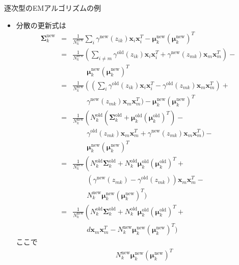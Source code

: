 \documentclass[dvipdfmx,notheorems,t]{beamer}
\begin{document}
\begin{frame}{逐次型のEMアルゴリズムの例}
\begin{itemize}
\begin{itemize}
		\item 分散の更新式は
		\begin{eqnarray}
			\bm{\Sigma}_k^\mathrm{new} &=& \frac{1}{N_k^\mathrm{new}} \sum_i \gamma^\mathrm{new}(z_{ik}) \bm{x}_i \bm{x}_i^T - \bm{\mu}_k^\mathrm{new} (\bm{\mu}_k^\mathrm{new})^T \\
			&=& \frac{1}{N_k^\mathrm{new}} \left( \sum_{i \neq m} \gamma^\mathrm{old}(z_{ik}) \bm{x}_i \bm{x}_i^T + \gamma^\mathrm{new}(z_{mk}) \bm{x}_m \bm{x}_m^T \right) - \nonumber \\
			&& \qquad \bm{\mu}_k^\mathrm{new} (\bm{\mu}_k^\mathrm{new})^T \\
			&=& \frac{1}{N_k^\mathrm{new}} \left( \left( \sum_i \gamma^\mathrm{old}(z_{ik}) \bm{x}_i \bm{x}_i^T - \gamma^\mathrm{old}(z_{mk}) \bm{x}_m \bm{x}_m^T \right) + \right. \nonumber \\
			&& \qquad \gamma^\mathrm{new}(z_{mk}) \bm{x}_m \bm{x}_m^T \Bigg) - \bm{\mu}_k^\mathrm{new} (\bm{\mu}_k^\mathrm{new})^T \\
			&=& \frac{1}{N_k^\mathrm{new}} \left( N_k^\mathrm{old} \left( \bm{\Sigma}_k^\mathrm{old} + \bm{\mu}_k^\mathrm{old} (\bm{\mu}_k^\mathrm{old})^T \right) - \right. \nonumber \\
			&& \qquad \gamma^\mathrm{old}(z_{mk}) \bm{x}_m \bm{x}_m^T + \gamma^\mathrm{new}(z_{mk}) \bm{x}_m \bm{x}_m^T \Bigg) - \nonumber \\
			&& \qquad \bm{\mu}_k^\mathrm{new} (\bm{\mu}_k^\mathrm{new})^T \\
			&=& \frac{1}{N_k^\mathrm{new}} \left( N_k^\mathrm{old} \bm{\Sigma}_k^\mathrm{old} + N_k^\mathrm{old} \bm{\mu}_k^\mathrm{old} (\bm{\mu}_k^\mathrm{old})^T + \right. \nonumber \\
			&& \qquad \left( \gamma^\mathrm{new}(z_{mk}) - \gamma^\mathrm{old}(z_{mk}) \right) \bm{x}_m \bm{x}_m^T - \nonumber \\
			&& \qquad N_k^\mathrm{new} \bm{\mu}_k^\mathrm{new} (\bm{\mu}_k^\mathrm{new})^T \Bigg) \nonumber \\
			&=& \frac{1}{N_k^\mathrm{new}} \left( N_k^\mathrm{old} \bm{\Sigma}_k^\mathrm{old} + N_k^\mathrm{old} \bm{\mu}_k^\mathrm{old} (\bm{\mu}_k^\mathrm{old})^T + \right. \nonumber \\
			&& \qquad d \bm{x}_m \bm{x}_m^T - N_k^\mathrm{new} \bm{\mu}_k^\mathrm{new} (\bm{\mu}_k^\mathrm{new})^T \Bigg)
		\end{eqnarray}
		ここで
		\begin{eqnarray}
			&& N_k^\mathrm{new} \bm{\mu}_k^\mathrm{new} (\bm{\mu}_k^\mathrm{new})^T \nonumber \\

\end{eqnarray}
\end{itemize}
\end{itemize}
\end{frame}
\end{document}
